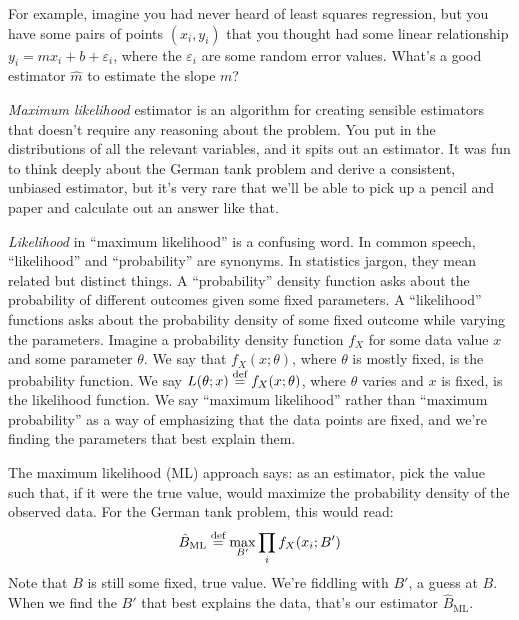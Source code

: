 For example, imagine you had never heard of least squares regression, but you
have some pairs of points $(x_i, y_i)$ that you thought had some linear
relationship $y_i = m x_i + b + \varepsilon_i$, where the $\varepsilon_i$ are
some random error values. What's a good estimator $\hat{m}$ to estimate the
slope $m$?

\emph{Maximum likelihood} estimator is an algorithm for creating sensible
estimators that doesn't require any reasoning about the problem. You put in
the distributions of all the relevant variables, and it spits out an
estimator. It was fun to think deeply about the German tank problem and
derive a consistent, unbiased estimator, but it's very rare that we'll be
able to pick up a pencil and paper and calculate out an answer like that.

\emph{Likelihood} in ``maximum likelihood'' is a confusing word. In common
speech, ``likelihood'' and ``probability'' are synonyms. In statistics jargon,
they mean related but distinct things. A ``probability'' density function asks
about the probability of different outcomes given some fixed parameters. A
``likelihood'' functions asks about the probability density of some fixed
outcome while varying the parameters. Imagine a probability density function
$f_X$ for some data value $x$ and some parameter $\theta$. We say that $f_X(x;
\theta)$, where $\theta$ is mostly fixed, is the probability function. We say
$L(\theta; x) \stackrel{\text{def}}{=} f_X(x; \theta)$, where $\theta$ varies and $x$ is fixed,
is the likelihood function. We say ``maximum likelihood'' rather than
``maximum probability'' as a way of emphasizing that the data points are
fixed, and we're finding the parameters that best explain them.

The maximum likelihood (ML) approach says: as an estimator, pick the value
such that, if it were the true value, would maximize the probability density
of the observed data. For the German tank problem, this would read:
\begin{equation}
\hat{B}_\text{ML} \stackrel{\text{def}}{=} \max_{B'} \prod_i f_X(x_i; B')
\end{equation}
Note that $B$ is still some fixed, true value. We're fiddling with $B'$, a
guess at $B$. When we find the $B'$ that best explains the data, that's our
estimator $\hat{B}_\mathrm{ML}$.

